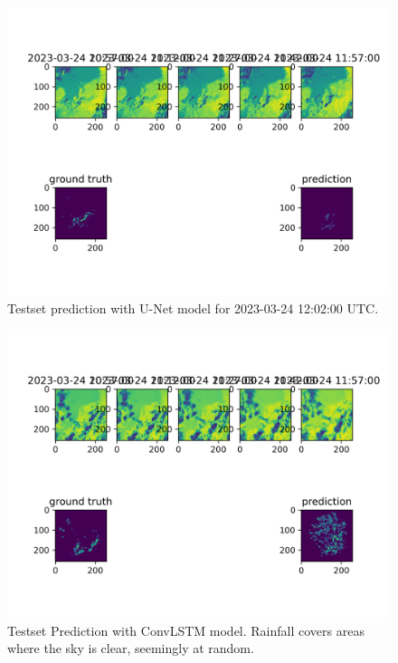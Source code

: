 \documentclass[acmtog, screen, balance]{acmart}
\begin{document}
\begin{figure}[hbp]
  \centering
  \includegraphics[width=370pt]{./images/experiment-0-unet.png}
  \caption{Testset prediction with U-Net model for 2023-03-24 12:02:00 UTC.}
  \Description{}
  \label{fig:unet-pred}
\end{figure}

\begin{figure}[hbp]
  \centering
  \includegraphics[width=370pt]{./images/experiment-19.png}
  \caption{Testset Prediction with ConvLSTM model. Rainfall covers areas where
  the sky is clear, seemingly at random.}
  \Description{}
  \label{fig:experiment-19}
\end{figure}
\end{document}
